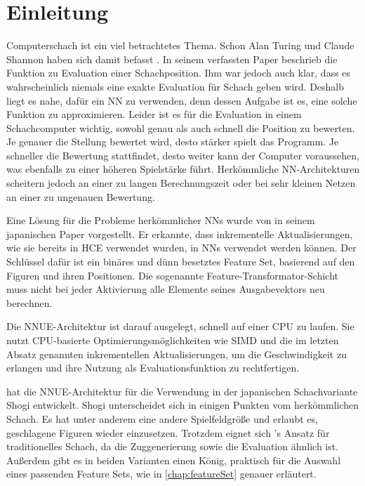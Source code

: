 \chapter{Einleitung}

Computerschach ist ein viel betrachtetes Thema. Schon Alan Turing und Claude Shannon haben sich damit befasst \cite{Turing1953, Shannon1950}. In seinem \citeyear{Shannon1950} verfassten Paper beschrieb \citeauthor{Shannon1950} \cite{Shannon1950} die Funktion zu Evaluation einer Schachposition. Ihm war jedoch auch klar, dass es wahrscheinlich niemals eine exakte Evaluation für Schach geben wird. Deshalb liegt es nahe, dafür ein \Ac{NN} zu verwenden, denn dessen Aufgabe ist es, eine solche Funktion zu approximieren. Leider ist es für die Evaluation in einem Schachcomputer wichtig, sowohl genau als auch schnell die Position zu bewerten. Je genauer die Stellung bewertet wird, desto stärker spielt das Programm. Je schneller die Bewertung stattfindet, desto weiter kann der Computer voraussehen, was ebenfalls zu einer höheren Spielstärke führt. Herkömmliche \ac{NN}-Architekturen scheitern jedoch an einer zu langen Berechnungszeit oder bei sehr kleinen Netzen an einer zu ungenauen Bewertung.

Eine Lösung für die Probleme herkömmlicher \acp{NN} wurde \citeyear{YNasu2018} von \citeauthor{YNasu2018} \cite{YNasu2018} in seinem japanischen Paper vorgestellt. Er erkannte, dass inkrementelle Aktualisierungen, wie sie bereits in \ac{HCE} verwendet wurden, in \acp{NN} verwendet werden können. Der Schlüssel dafür ist ein binäres und dünn besetztes Feature Set, basierend auf den Figuren und ihren Positionen. Die sogenannte Feature-Transformator-Schicht muss nicht bei jeder Aktivierung alle Elemente seines Ausgabevektors neu berechnen.

Die \ac{NNUE}-Architektur ist darauf ausgelegt, schnell auf einer CPU zu laufen. Sie nutzt CPU-basierte Optimierungsmöglichkeiten wie \ac{SIMD} und die im letzten Absatz genannten inkrementellen Aktualisierungen, um die Geschwindigkeit zu erlangen und ihre Nutzung als Evaluationsfunktion zu rechtfertigen.

\citeauthor{YNasu2018} \cite{YNasu2018} hat die \ac{NNUE}-Architektur für die Verwendung in der japanischen Schachvariante Shogi entwickelt. Shogi unterscheidet sich in einigen Punkten vom herkömmlichen Schach. Es hat unter anderem eine andere Spielfeldgröße und erlaubt es, geschlagene Figuren wieder einzusetzen. Trotzdem eignet sich \citeauthor{YNasu2018}'s \cite{YNasu2018} Ansatz für traditionelles Schach, da die Zuggenerierung sowie die Evaluation ähnlich ist. Außerdem gibt es in beiden Varianten einen König, praktisch für die Auswahl eines passenden Feature Sets, wie in \autoref{chap:featureSet} genauer erläutert.

